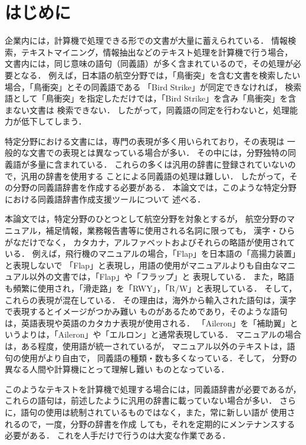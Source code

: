 \documentclass[japanese]{jnlp_1.4}
\begin{document}
\maketitle



\section{はじめに}

企業内には，計算機で処理できる形での文書が大量に蓄えられている．
情報検索，テキストマイニング，情報抽出などのテキスト処理を計算機で行う場合，
文書内には，同じ意味の語句（同義語）が多く含まれているので，その処理が必要となる．
例えば，日本語の航空分野では，「鳥衝突」を含む文書を検索したい場合，「鳥衝突」とその同義語である
「Bird Strike」が同定できなければ，
検索語として「鳥衝突」を指定しただけでは，「Bird Strike」を含み「鳥衝突」を含まない文書は
検索できない．
したがって，同義語の同定を行わないと，処理能力が低下してしまう．

特定分野における文書には，専門の表現が多く用いられており，その表現は
一般的な文書での表現とは異なっている場合が多い．
その中には，分野独特の同義語が多量に含まれている．
これらの多くは汎用の辞書に登録されていないので，汎用の辞書を使用する
ことによる同義語の処理は難しい．
したがって，その分野の同義語辞書を作成する必要がある．
本論文では，このような特定分野における同義語辞書作成支援ツールについて
述べる．

本論文では，特定分野のひとつとして航空分野を対象とするが，
航空分野のマニュアル，補足情報，業務報告書等に使用される名詞に限っても，
漢字・ひらがなだけでなく，
カタカナ，アルファベットおよびそれらの略語が使用されている．
例えば，飛行機のマニュアルの場合，「Flap」を日本語の「高揚力装置」と表現しないで
「Flap」と表現し，用語の使用がマニュアルよりも自由なマニュアル以外の文書では，「Flap」や「フラップ」と
表現している．
また，略語も頻繁に使用され，「滑走路」を「RWY」，「R/W」と表現している．
そして，これらの表現が混在している．
その理由は，海外から輸入された語句は，漢字で表現するとイメージがつかみ難い
ものがあるためであり，そのような語句は，英語表現や英語のカタカナ表現が使用される．
「Aileron」を「補助翼」というよりは，「Aileron」や「エルロン」と通常表現している．
マニュアルの場合は，ある程度，使用語が統一されているが，
マニュアル以外のテキストは，語句の使用がより自由で，
同義語の種類・数も多くなっている．そして，
分野の異なる人間や計算機にとって理解し難い
ものとなっている．

このようなテキストを計算機で処理する場合には，同義語辞書が必要であるが，
これらの語句は，前述したように汎用の辞書に載っていない場合が多い．
さらに，語句の使用は統制されているものではなく，また，常に新しい語が
使用されるので，一度，分野の辞書を作成
しても，それを定期的にメンテナンスする必要がある．
これを人手だけで行うのは大変な作業である．
\end{document}
